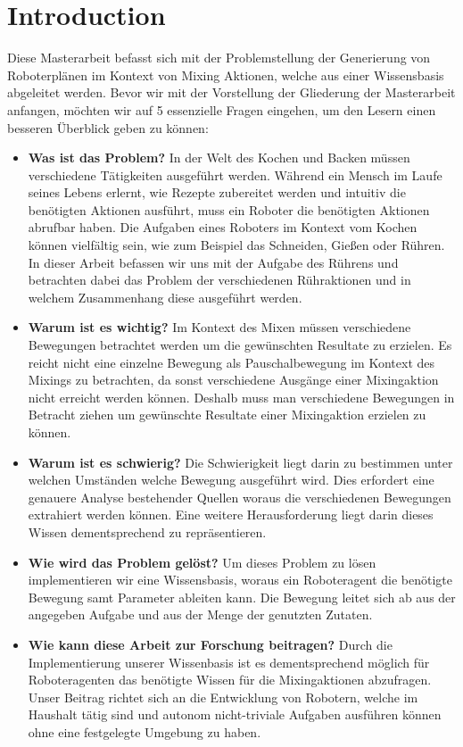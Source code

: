 \chapter*{Introduction}

Diese Masterarbeit befasst sich mit der Problemstellung der Generierung von Roboterplänen im Kontext von Mixing Aktionen, welche aus einer Wissensbasis abgeleitet werden.
Bevor wir mit der Vorstellung der Gliederung der Masterarbeit anfangen, möchten wir auf 5 essenzielle Fragen eingehen, um den Lesern einen besseren Überblick geben zu können:
\begin{itemize}
    \item \textbf{Was ist das Problem?} In der Welt des Kochen und Backen müssen verschiedene Tätigkeiten ausgeführt werden. Während ein Mensch im Laufe seines Lebens erlernt, wie Rezepte zubereitet werden und intuitiv die benötigten Aktionen ausführt, muss ein Roboter die benötigten Aktionen abrufbar haben. Die Aufgaben eines Roboters im Kontext vom Kochen können vielfältig sein, wie zum Beispiel das Schneiden, Gießen oder Rühren. In dieser Arbeit befassen wir uns mit der Aufgabe des Rührens und betrachten dabei das Problem der verschiedenen Rühraktionen und in welchem Zusammenhang diese ausgeführt werden. 
    \item \textbf{Warum ist es wichtig?} Im Kontext des Mixen müssen verschiedene Bewegungen betrachtet werden um die gewünschten Resultate zu erzielen. Es reicht nicht eine einzelne Bewegung als Pauschalbewegung im Kontext des Mixings zu betrachten, da sonst verschiedene Ausgänge einer Mixingaktion nicht erreicht werden können. Deshalb muss man verschiedene Bewegungen in Betracht ziehen um gewünschte Resultate einer Mixingaktion erzielen zu können.
    \item \textbf{Warum ist es schwierig?} Die Schwierigkeit liegt darin zu bestimmen unter welchen Umständen welche Bewegung ausgeführt wird. Dies erfordert eine genauere Analyse bestehender Quellen woraus die verschiedenen Bewegungen extrahiert werden können. Eine weitere Herausforderung liegt darin dieses Wissen dementsprechend zu repräsentieren.
    \item \textbf{Wie wird das Problem gelöst?} Um dieses Problem zu lösen implementieren wir eine Wissensbasis, woraus ein Roboteragent die benötigte Bewegung samt Parameter ableiten kann. Die Bewegung leitet sich ab aus der angegeben Aufgabe und aus der Menge der genutzten Zutaten.
    \item \textbf{Wie kann diese Arbeit zur Forschung beitragen?} Durch die Implementierung unserer Wissenbasis ist es dementsprechend möglich für Roboteragenten das benötigte Wissen für die Mixingaktionen abzufragen. Unser Beitrag richtet sich an die Entwicklung von Robotern, welche im Haushalt tätig sind und autonom nicht-triviale Aufgaben ausführen können ohne eine festgelegte Umgebung zu haben.
\end{itemize}


